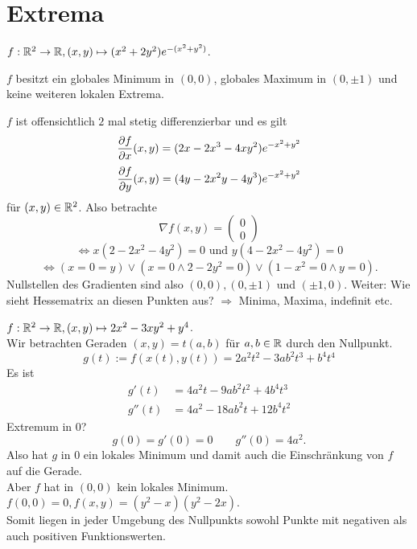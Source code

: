 \documentclass[../ana2u.tex]{subfiles}
\begin{document}
\setcounter{section}{10}
\section{Extrema}
\( f:\mathbb{R}^2\rightarrow \mathbb{R}, (x,y) \mapsto (x^2 + 2y^2) e^{-(x^2 + y^2)} \).

\begin{beh}
    \(f\) besitzt ein globales Minimum in \((0,0)\), globales Maximum in
    \((0, \pm 1)\) und keine weiteren lokalen Extrema.
\end{beh}
\begin{bew}
    \(f\) ist offensichtlich \( 2 \) mal stetig differenzierbar und 
    es gilt 
    \[ \frac{\partial f}{\partial x} (x,y) = (2x - 2x^3 - 4xy^2)e^{-x^2 + y^2} \]
    \[ \frac{\partial f}{\partial y} (x,y) = (4y - 2x^2y - 4y^3)e^{-x^2 + y^2} \]
    für \( (x,y) \in \mathbb{R}^2 \).
    Also betrachte 
    \[ \nabla f(x,y) = \begin{pmatrix} 0 \\ 0\end{pmatrix} \]
    \[ \Leftrightarrow x(2 - 2x^2 - 4y^2) = 0 \text{ und }
    y(4 - 2x^2 - 4y^2) = 0 \]
    \[ \Leftrightarrow (x = 0 = y) \vee (x = 0 \wedge 2 - 2y^2 = 0)
    \vee (1 - x^2 = 0 \wedge y = 0). \]
    Nullstellen des Gradienten sind also \( (0,0), (0, \pm 1) \) 
    und \( (\pm 1, 0) \). 
    Weiter: Wie sieht Hessematrix an diesen Punkten aus?
    \( \Rightarrow \) Minima, Maxima, indefinit etc.
\end{bew}
\begin{bsp}
    \( f:\mathbb{R}^2\rightarrow \mathbb{R}, (x,y) \mapsto 2x^2 - 3xy^2 + y^4 \).\\
    Wir betrachten Geraden \((x,y) = t(a,b)\)
    für \(a, b \in \mathbb{R}\) durch den Nullpunkt.
    \[ g(t) := f(x(t), y(t)) = 2a^2t^2-3ab^2t^3+b^4t^4 \]    
    Es ist 
    \begin{align*}
        g'(t) &= 4a^2 t - 9 ab^2 t^2 + 4 b^4 t^3\\
        g''(t) &= 4a^2 - 18ab^2 t + 12 b^4 t^2
    \end{align*}
    Extremum in \(0\)?
    \[ g(0) = g'(0) = 0 \qquad g''(0) = 4a^2. \]
    Also hat \(g\) in \(0\) ein lokales Minimum und damit auch die 
    Einschränkung von \(f\) auf die Gerade.\\
    Aber \(f\) hat in \((0,0)\) kein lokales Minimum.
    \(f(0,0) = 0, f(x,y) = (y^2-x)(y^2-2x) \).\\
    Somit liegen in jeder Umgebung des Nullpunkts sowohl Punkte mit
    negativen als auch positiven Funktionswerten. 
\end{bsp}
\end{document}
